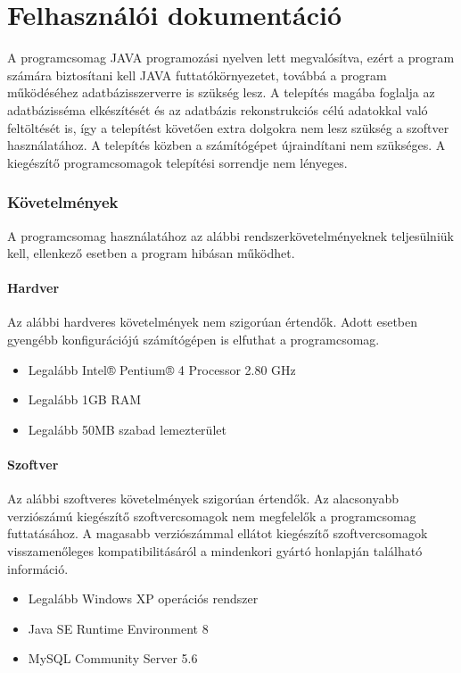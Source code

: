 \part{Felhasználói dokumentáció}
A programcsomag JAVA programozási nyelven lett megvalósítva, ezért a program számára biztosítani kell JAVA futtatókörnyezetet, továbbá a program működéséhez adatbázisszerverre is szükség lesz. A telepítés magába foglalja az adatbázisséma elkészítését és az adatbázis rekonstrukciós célú adatokkal való feltöltését is, így a telepítést követően extra dolgokra nem lesz szükség a szoftver használatához. A telepítés közben a számítógépet újraindítani nem szükséges. A kiegészítő programcsomagok telepítési sorrendje nem lényeges.

\section{Követelmények}
A programcsomag használatához az alábbi rendszerkövetelményeknek teljesülniük kell, ellenkező esetben a program hibásan működhet.

\subsection{Hardver}
Az alábbi hardveres követelmények nem szigorúan értendők. Adott esetben gyengébb konfigurációjú számítógépen is elfuthat a programcsomag.
\begin{itemize}
\item Legalább Intel® Pentium® 4 Processor 2.80 GHz
\item Legalább 1GB RAM
\item Legalább 50MB szabad lemezterület
\end{itemize}

\subsection{Szoftver}
Az alábbi szoftveres követelmények szigorúan értendők. Az alacsonyabb verziószámú kiegészítő szoftvercsomagok nem megfelelők a programcsomag futtatásához. A magasabb verziószámmal ellátot kiegészítő szoftvercsomagok visszamenőleges kompatibilitásáról a mindenkori gyártó honlapján található információ.
\begin{itemize}
\item Legalább Windows XP operációs rendszer
\item Java SE Runtime Environment 8
\item MySQL Community Server 5.6
\end{itemize}

